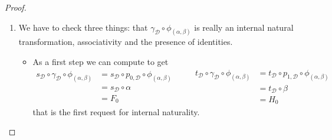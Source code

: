 \documentclass[a4paper,UKenglish,cleveref,pdftex,thm-restate,numberwithinsect]{lipics-v2021}
\begin{document}
	\begin{proof}
		\begin{enumerate}
			\item We have to check three things: that $\gamma_{\mathcal{D}}\circ \phi_{(\alpha, \beta)}$ is really an internal natural transformation, associativity and the presence of identities.
			\begin{itemize}
				\item As a first step we can compute to get
				\[\begin{split}
					s_{\mathcal{D}}\circ \gamma_{\mathcal{D}} \circ \phi_{(\alpha, \beta)}&=s_{\mathcal{D}}\circ p_{0, \mathcal{D}}\circ \phi_{(\alpha, \beta)}\\&= s_{\mathcal{D}} \circ \alpha\\&= F_0
				\end{split} \qquad  \begin{split}
				t_{\mathcal{D}}\circ \gamma_{\mathcal{D}} \circ \phi_{(\alpha, \beta)}&=t_{\mathcal{D}}\circ p_{1, \mathcal{D}}\circ \phi_{(\alpha, \beta)}\\&= t_{\mathcal{D}} \circ \beta\\&= H_0
				\end{split}\]
				that is the first request for internal naturality.
				

\end{itemize}
\end{enumerate}
\end{proof}
\end{document}
